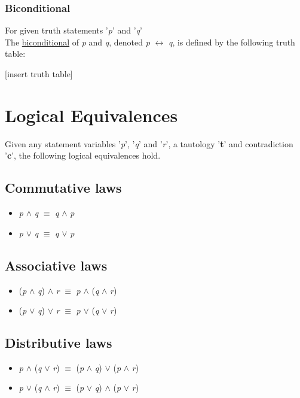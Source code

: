 \documentclass{article}
\begin{document}
\subsubsection{Biconditional}
For given truth statements '\textit{p}' and '\textit{q}' \\
The \underline{biconditional} of  \textit{p} and \textit{q}, denoted \textit{p} $\leftrightarrow$ \textit{q},
 is defined by the following truth table:

[insert truth table]

\section{Logical Equivalences}

Given any statement variables '\textit{p}', '\textit{q}' and '\textit{r}', a tautology '\textbf{t}' and contradiction '\textbf{c}', the following
logical equivalences hold.


\subsection{Commutative laws}
\begin{itemize} 
\item \textit{p} $\wedge$ \textit{q} $\equiv$ \textit{q} $\wedge$ \textit{p}
\item \textit{p} $\lor$ \textit{q} $\equiv$ \textit{q} $\lor$ \textit{p}
\end{itemize}

\subsection{Associative laws}
\begin{itemize}
\item (\textit{p} $\wedge$ \textit{q}) $\wedge$ \textit{r} $\equiv$ \textit{p} $\wedge$ (\textit{q} $\wedge$ \textit{r})
\item (\textit{p} $\lor$ \textit{q}) $\lor$ \textit{r} $\equiv$ \textit{p} $\lor$ (\textit{q} $\lor$ \textit{r})
\end{itemize}

\subsection{Distributive laws}
\begin{itemize}
\item \textit{p} $\wedge$ (\textit{q} $\lor$ \textit{r}) $\equiv$ (\textit{p} $\wedge$ \textit{q}) $\lor$ (\textit{p} $\wedge$ \textit{r})
\item \textit{p} $\lor$ (\textit{q} $\wedge$ \textit{r}) $\equiv$ (\textit{p} $\lor$ \textit{q}) $\wedge$ (\textit{p} $\lor$ \textit{r})
\end{itemize}
\end{document}
